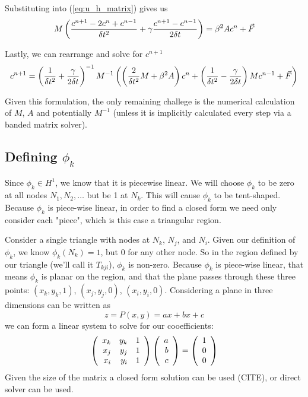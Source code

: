 \documentclass[a4paper,12pt]{article}
\begin{document}
Substituting into (\ref{eq:u_h_matrix}) gives us
\begin{equation} \label{eq:finite_diff_weak_form}
M \left( \frac{c^{n+1} - 2c^n + c^{n-1}}{\delta t^2} + \gamma \frac{c^{n+1} - c^{n-1}}{2\delta t} \right) = \beta^2 A c^n + \vec{F}
\end{equation}

Lastly, we can rearrange and solve for $c^{n+1}$
\begin{equation} \label{eq:finite_diff_solution}
c^{n+1} = \left( \frac{1}{\delta t^2} + \frac{\gamma}{2\delta t} \right)^{-1} M^{-1}
\left(
\left( \frac{2}{\delta t^2}M + \beta^2 A \right) c^n
+
\left( \frac{1}{\delta t^2} - \frac{\gamma}{2\delta t} \right) M c^{n-1}
+
\vec{F}
\right)
\end{equation}

Given this formulation, the only remaining challege is the numerical calculation of $M$, $A$ and potentially
$M^{-1}$ (unless it is implicitly calculated every step via a banded matrix solver).
\cite{greenwade93}

\subsection{Defining $\phi_k$}
Since $\phi_k \in H^1$, we know that it is piecewise linear. We will choose $\phi_k$ to be zero at all nodes
$N_1, N_2, \ldots$ but be 1 at $N_k$. This will cause $\phi_k$ to be tent-shaped. Because $\phi_k$ is piece-wise linear,
in order to find a closed form we need only consider each "piece", which is this case a triangular region.

Consider a single triangle with nodes at $N_k$, $N_j$, and $N_i$. Given our definition of $\phi_k$, we know $\phi_k(N_k) = 1$,
but 0 for any other node. So in the region defined by our triangle (we'll call it $T_{kji}$), $\phi_k$ is non-zero. Because
$\phi_k$ is piece-wise linear, that means $\phi_k$ is planar on the region, and that the plane passes through these three points:
$(x_k, y_k, 1)$, $(x_j, y_j, 0)$, $(x_i, y_i, 0)$. Considering a plane in three dimensions can be written as
\begin{equation} \label{eq:plane}
z = P(x, y) = ax + bx + c
\end{equation}
we can form a linear system to solve for our cooefficients:
\begin{equation} \label{eq:plane_solution}
\left(\begin{array}{rrrr} 
    x_k & y_k & 1 \\
    x_j & y_j & 1 \\
    x_i & y_i & 1
 \\ \end{array} \right)
\left(\begin{array}{rrrr} a \\ b \\ c \\ \end{array} \right)
=
\left(\begin{array}{rrrr} 1 \\ 0 \\ 0 \\ \end{array} \right)
\end{equation}
Given the size of the matrix a closed form solution can be used (CITE), or direct solver can be used.
\end{document}
